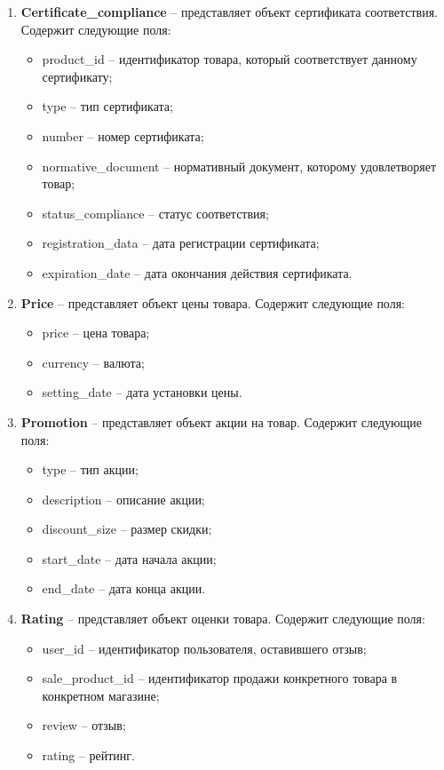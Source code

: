 \begin{enumerate}
	\item \textbf{Certificate\_compliance} -- представляет объект сертификата соответствия. Содержит следующие поля: 
	\begin{itemize}
		\item product\_id -- идентификатор товара, который соответствует данному сертификату;
		\item type -- тип сертификата;
		\item number -- номер сертификата;
		\item normative\_document -- нормативный документ, которому удовлетворяет товар;
		\item status\_compliance -- статус соответствия;
		\item registration\_data -- дата регистрации сертификата;
		\item expiration\_date -- дата окончания действия сертификата.
	\end{itemize}
	
	\item \textbf{Price} -- представляет объект цены товара. Содержит следующие поля: 
	\begin{itemize}
		\item price -- цена товара;
		\item currency -- валюта;
		\item setting\_date -- дата установки цены.
	\end{itemize}
	
	\item \textbf{Promotion} -- представляет объект акции на товар. Содержит следующие поля: 
	\begin{itemize}
		\item type -- тип акции;
		\item description -- описание акции;
		\item discount\_size -- размер скидки;
		\item start\_date -- дата начала акции;
		\item end\_date -- дата конца акции.
	\end{itemize}
	
	\item \textbf{Rating} -- представляет объект оценки товара. Содержит следующие поля: 
	\begin{itemize}
		\item user\_id -- идентификатор пользователя, оставившего отзыв;
		\item  sale\_product\_id -- идентификатор продажи конкретного товара в конкретном магазине;
		\item review -- отзыв;
		\item rating -- рейтинг.
	\end{itemize}
	

\end{enumerate}
